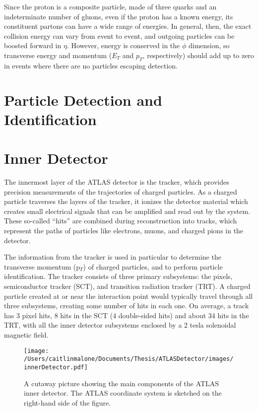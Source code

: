 Since the proton is a composite particle, made of three quarks and an indeterminate number of gluons, even if the proton has a known energy, its constituent partons can have a wide range of energies.  In general, then, the exact collision energy can vary from event to event, and outgoing particles can be boosted forward in $\eta$.  However, energy is conserved in the $\phi$ dimension, so transverse energy and momentum ($E_T$ and $p_T$, respectively) should add up to zero in events where there are no particles escaping detection.

\section{Particle Detection and Identification}


\section{Inner Detector}
The innermost layer of the ATLAS detector is the tracker, which provides precision measurements of the trajectories of charged particles.  As a charged particle traverses the layers of the tracker, it ionizes the detector material which creates small electrical signals that can be amplified and read out by the system.  These so-called ``hits'' are combined during reconstruction into tracks, which represent the paths of particles like electrons, muons, and charged pions in the detector.

The information from the tracker is used in particular to determine the transverse momentum (p$_T$) of charged particles, and to perform particle identification.  The tracker consists of three primary subsystems: the pixels, semiconductor tracker (SCT), and transition radiation tracker (TRT).  A charged particle created at or near the interaction point would typically travel through all three subsystems, creating some number of hits in each one.  On average, a track has 3 pixel hits, 8 hits in the SCT (4 double-sided hits) and about 34 hits in the TRT, with all the inner detector subsystems enclosed by a 2 tesla solenoidal magnetic field. 


\begin{figure}
	\texttt{[image: /Users/caitlinmalone/Documents/Thesis/ATLASDetector/images/innerDetector.pdf]}
	\label{fig:inner_detector}  
	\caption{A cutaway picture showing the main components of the ATLAS inner detector.  The ATLAS coordinate system is sketched on the right-hand side of the figure.}
\end{figure}


